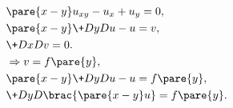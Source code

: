 \documentclass[hidelinks]{ctexart}
\begin{document}
\begin{align*}
    &\pare{x-y}u_{xy} -u_x + u_y = 0, \\
    & \pare{x-y}\+DyDu - u = v, \\
    &\+DxDv = 0.\\
    & \Rightarrow v = f\pare{y},\\
    & \pare{x-y}\+DyDu - u = f\pare{y},\\
    & \+DyD{}\brac{\pare{x-y}u} = f\pare{y}.
\end{align*}
\end{document}
